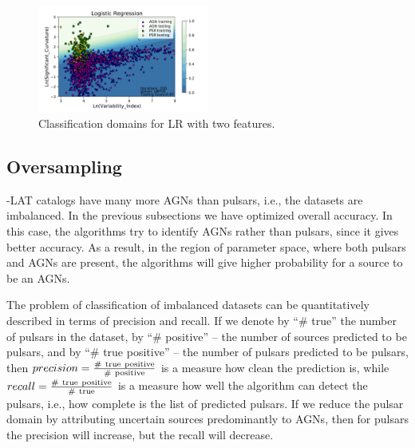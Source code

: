 \begin{figure}[h]
\includegraphics[width=0.5\textwidth]{plots/classification_domains/lr_200_lbfgs.pdf}
\caption{Classification domains for LR with two features.}
\label{fig:LR_domains}
\end{figure}


\subsection{Oversampling}

\Fermi-LAT catalogs have many more AGNs than pulsars, i.e., the datasets are imbalanced.
In the previous subsections we have optimized overall accuracy. In this case, the algorithms try to identify AGNs rather than pulsars,
since it gives better accuracy. As a result, in the region of parameter space, where both pulsars and AGNs are present, the algorithms
will give higher probability for a source to be an AGNs.

The problem of classification of imbalanced datasets can be quantitatively described in terms of precision and recall.
If we denote by ``\# true'' the number of pulsars in the dataset, by ``\# positive'' -- the number of sources predicted to be pulsars, and by 
``\# true positive'' -- the number of pulsars predicted to be pulsars, then  $precision \rm = \frac{\#\ true\ positive}{\#\ positive}$ is a measure how clean the prediction is, while $recall \rm = \frac{\#\ true\ positive}{\#\ true}$ is a measure how well the algorithm can detect the pulsars, i.e., how complete is the list of predicted pulsars.
If we reduce the pulsar domain by attributing uncertain sources predominantly to AGNs, then for pulsars the precision will increase, but the recall will decrease.



